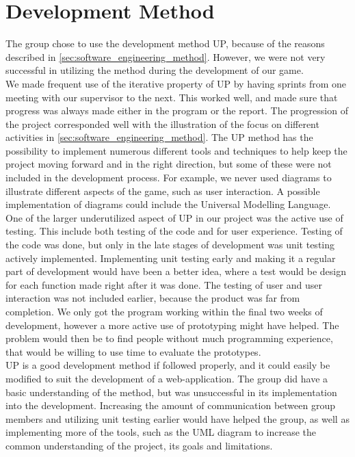 \section{Development Method}
\label{sec:problems_with_UP}

The group chose to use the development method UP, because of the reasons described in \autoref{sec:software_engineering_method}. However, we were not very successful in utilizing the method during the development of our game.\\

We made frequent use of the iterative property of UP by having sprints from one meeting with our supervisor to the next. This worked well, and made sure that progress was always made either in the program or the report. The progression of the project corresponded well with the illustration of the focus on different activities in \autoref{sec:software_engineering_method}. The UP method has the possibility to implement numerous different tools and techniques to help keep the project moving forward and in the right direction, but some of these were not included in the development process. For example, we never used diagrams to illustrate different aspects of the game, such as user interaction. A possible implementation of diagrams could include the Universal Modelling Language.\\

One of the larger underutilized aspect of UP in our project was the active use of testing. This include both testing of the code and for user experience. Testing of the code was done, but only in the late stages of development was unit testing actively implemented. Implementing unit testing early and making it a regular part of development would have been a better idea, where a test would be design for each function made right after it was done. The testing of user and user interaction was not included earlier, because the product was far from completion. We only got the program working within the final two weeks of development, however a more active use of prototyping might have helped. The problem would then be to find people without much programming experience, that would be willing to use time to evaluate the prototypes.\\

UP is a good development method if followed properly, and it could easily be modified to suit the development of a web-application. The group did have a basic understanding of the method, but was unsuccessful in its implementation into the development. Increasing the amount of communication between group members and utilizing unit testing earlier would have helped the group, as well as implementing more of the tools, such as the UML diagram to increase the common understanding of the project, its goals and limitations.

